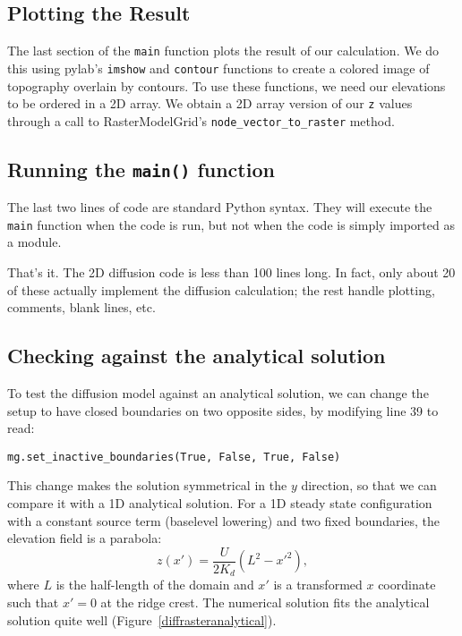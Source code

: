 \documentclass[12pt]{article}
\newcommand{\code}[1]{{\tt #1}}
\begin{document}
\subsection{Plotting the Result}



The last section of the \code{main} function plots the result of our calculation. We do this using pylab's \code{imshow} and \code{contour} functions to create a colored image of topography overlain by contours. To use these functions, we need our elevations to be ordered in a 2D array. We obtain a 2D array version of our \code{z} values through a call to RasterModelGrid's \code{node\_vector\_to\_raster} method.

\subsection{Running the \code{main()} function}



The last two lines of code are standard Python syntax. They will execute the \code{main} function when the code is run, but not when the code is simply imported as a module.

That's it. The 2D diffusion code is less than 100 lines long. In fact, only about 20 of these actually implement the diffusion calculation; the rest handle plotting, comments, blank lines, etc.

\subsection{Checking against the analytical solution}

To test the diffusion model against an analytical solution, we can change the setup to have closed boundaries on two opposite sides, by modifying line 39 to read:

\code{mg.set\_inactive\_boundaries(True, False, True, False)}

This change makes the solution symmetrical in the $y$ direction, so that we can compare it with a 1D analytical solution. For a 1D steady state configuration with a constant source term (baselevel lowering) and two fixed boundaries, the elevation field is a parabola:
\begin{equation}
z(x') = \frac{U}{2K_d} \left( L^2 - x'^2 \right),
\end{equation}
where $L$ is the half-length of the domain and $x'$ is a transformed $x$ coordinate such that $x'=0$ at the ridge crest. The numerical solution fits the analytical solution quite well (Figure~\ref{diffrasteranalytical}).
\end{document}
